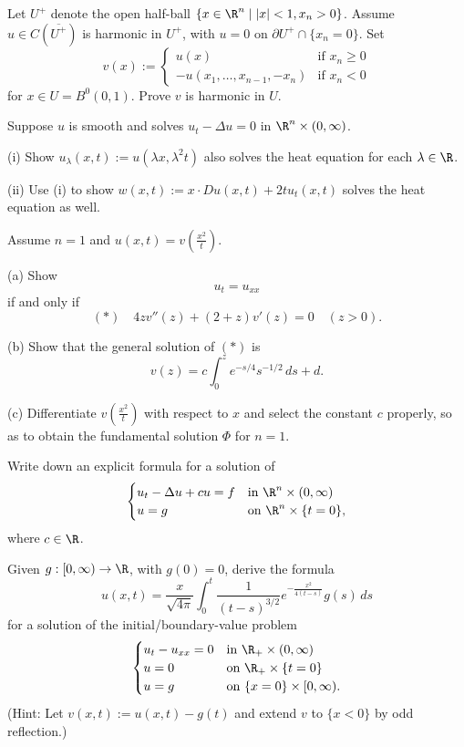 \begin{exercise}
Let $U^+$ denote the open half-ball $\{x \in \R^n \mid |x| < 1, x_n > 0\}$. Assume $u \in C(\overline{U^+})$ is harmonic in $U^+$, with $u = 0$ on $\partial U^+ \cap \{x_n = 0\}$. Set
$$v(x) := \begin{cases} u(x) & \text{if } x_n \ge 0 \\ -u(x_1, \ldots, x_{n-1}, -x_n) & \text{if } x_n < 0 \end{cases}$$
for $x \in U = B^0(0, 1)$. Prove $v$ is harmonic in $U$.
\end{exercise}

\begin{exercise}
Suppose $u$ is smooth and solves $u_t - \Delta u = 0$ in $\R^n \times (0, \infty)$.

\quad (i) Show $u_\lambda(x,t) := u(\lambda x, \lambda^2 t)$ also solves the heat equation for each $\lambda \in \R$.

\quad (ii) Use (i) to show $w(x,t) := x \cdot Du(x,t) + 2tu_t(x,t)$ solves the heat equation as well.
\end{exercise}

\begin{exercise}
Assume $n = 1$ and $u(x,t) = v\left(\frac{x^2}{t}\right)$.

\quad (a) Show
$$u_t = u_{xx}$$
if and only if
$$(*) \quad 4zv''(z) + (2+z)v'(z) = 0 \quad (z > 0).$$

\quad (b) Show that the general solution of $(*)$ is
$$v(z) = c\int_0^z e^{-s/4} s^{-1/2} \, ds + d.$$

\quad (c) Differentiate $v\left(\frac{x^2}{t}\right)$ with respect to $x$ and select the constant $c$ properly, so as to obtain the fundamental solution $\Phi$ for $n = 1$.
\end{exercise}

\begin{exercise}
Write down an explicit formula for a solution of
$$\begin{cases} u_t - \Delta u + cu = f & \text{in } \R^n \times (0, \infty) \\ u = g & \text{on } \R^n \times \{t = 0\}, \end{cases}$$
where $c \in \R$.
\end{exercise}

\begin{exercise}
Given $g : [0, \infty) \to \R$, with $g(0) = 0$, derive the formula
$$u(x,t) = \frac{x}{\sqrt{4\pi}} \int_0^t \frac{1}{(t-s)^{3/2}} e^{-\frac{x^2}{4(t-s)}} g(s) \, ds$$
for a solution of the initial/boundary-value problem
$$\begin{cases}
u_t - u_{xx} = 0 & \text{in } \R_+ \times (0, \infty) \\
u = 0 & \text{on } \R_+ \times \{t = 0\} \\
u = g & \text{on } \{x = 0\} \times [0, \infty).
\end{cases}$$
(Hint: Let $v(x,t) := u(x,t) - g(t)$ and extend $v$ to $\{x < 0\}$ by odd reflection.)
\end{exercise}

